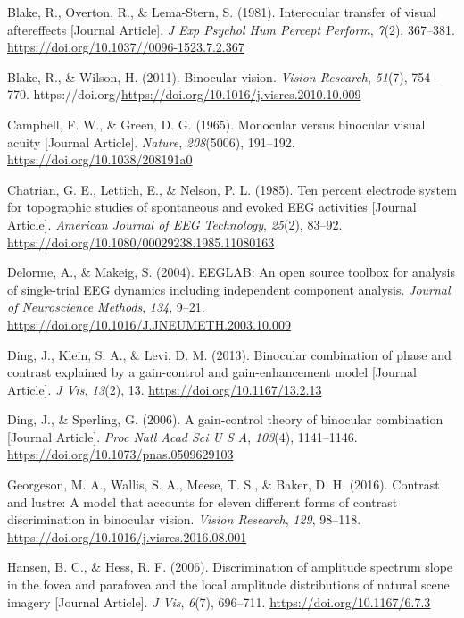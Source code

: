 \documentclass[
  12pt,
]{article}
\newlength{\cslhangindent}
\newenvironment{CSLReferences}[2] %
 {\begin{list}{}{%
  \setlength{\itemindent}{0pt}
  \setlength{\leftmargin}{0pt}
  \setlength{\parsep}{0pt}
  \ifodd #1
   \setlength{\leftmargin}{\cslhangindent}
   \setlength{\itemindent}{-1\cslhangindent}
  \fi
  \setlength{\itemsep}{#2\baselineskip}}}
 {\end{list}}
\begin{document}
\begin{CSLReferences}{1}{0}
Blake, R., Overton, R., \& Lema-Stern, S. (1981). Interocular transfer
of visual aftereffects {[}Journal Article{]}. \emph{J Exp Psychol Hum
Percept Perform}, \emph{7}(2), 367--381.
\url{https://doi.org/10.1037//0096-1523.7.2.367}

Blake, R., \& Wilson, H. (2011). Binocular vision. \emph{Vision
Research}, \emph{51}(7), 754--770.
https://doi.org/\url{https://doi.org/10.1016/j.visres.2010.10.009}

Campbell, F. W., \& Green, D. G. (1965). Monocular versus binocular
visual acuity {[}Journal Article{]}. \emph{Nature}, \emph{208}(5006),
191--192. \url{https://doi.org/10.1038/208191a0}

Chatrian, G. E., Lettich, E., \& Nelson, P. L. (1985). Ten percent
electrode system for topographic studies of spontaneous and evoked EEG
activities {[}Journal Article{]}. \emph{American Journal of EEG
Technology}, \emph{25}(2), 83--92.
\url{https://doi.org/10.1080/00029238.1985.11080163}

Delorme, A., \& Makeig, S. (2004). EEGLAB: An open source toolbox for
analysis of single-trial EEG dynamics including independent component
analysis. \emph{Journal of Neuroscience Methods}, \emph{134}, 9--21.
\url{https://doi.org/10.1016/J.JNEUMETH.2003.10.009}

Ding, J., Klein, S. A., \& Levi, D. M. (2013). Binocular combination of
phase and contrast explained by a gain-control and gain-enhancement
model {[}Journal Article{]}. \emph{J Vis}, \emph{13}(2), 13.
\url{https://doi.org/10.1167/13.2.13}

Ding, J., \& Sperling, G. (2006). A gain-control theory of binocular
combination {[}Journal Article{]}. \emph{Proc Natl Acad Sci U S A},
\emph{103}(4), 1141--1146. \url{https://doi.org/10.1073/pnas.0509629103}

Georgeson, M. A., Wallis, S. A., Meese, T. S., \& Baker, D. H. (2016).
Contrast and lustre: A model that accounts for eleven different forms of
contrast discrimination in binocular vision. \emph{Vision Research},
\emph{129}, 98--118. \url{https://doi.org/10.1016/j.visres.2016.08.001}

Hansen, B. C., \& Hess, R. F. (2006). Discrimination of amplitude
spectrum slope in the fovea and parafovea and the local amplitude
distributions of natural scene imagery {[}Journal Article{]}. \emph{J
Vis}, \emph{6}(7), 696--711. \url{https://doi.org/10.1167/6.7.3}


\end{CSLReferences}
\end{document}
